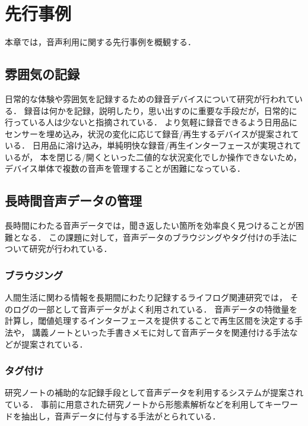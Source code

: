 \chapter{先行事例}
\label{chap:previous}

本章では，音声利用に関する先行事例を概観する．

\newpage

\section{雰囲気の記録}

日常的な体験や雰囲気を記録するための録音デバイスについて研究が行われている\cite{Poupyrev}．
録音は何かを記録，説明したり，思い出すのに重要な手段だが，日常的に行っている人は少ないと指摘されている．
より気軽に録音できるよう日用品にセンサーを埋め込み，状況の変化に応じて録音/再生するデバイスが提案されている．
日用品に溶け込み，単純明快な録音/再生インターフェースが実現されているが，
本を閉じる/開くといった二値的な状況変化でしか操作できないため，
デバイス単体で複数の音声を管理することが困難になっている．

\section{長時間音声データの管理}

長時間にわたる音声データでは，聞き返したい箇所を効率良く見つけることが困難となる．
この課題に対して，音声データのブラウジングやタグ付けの手法について研究が行われている．

\subsection{ブラウジング}

人間生活に関わる情報を長期間にわたり記録するライフログ関連研究では，
そのログの一部として音声データがよく利用されている\cite{Bell}．
音声データの特徴量を計算し，閾値処理するインターフェースを提供することで再生区間を決定する手法\cite{Kawamura}や，
講義ノートといった手書きメモに対して音声データを関連付ける手法\cite{Stifelman}などが提案されている．

\subsection{タグ付け}

研究ノートの補助的な記録手段として音声データを利用するシステムが提案されている\cite{Kawanishi}．
事前に用意された研究ノートから形態素解析などを利用してキーワードを抽出し，音声データに付与する手法がとられている．

